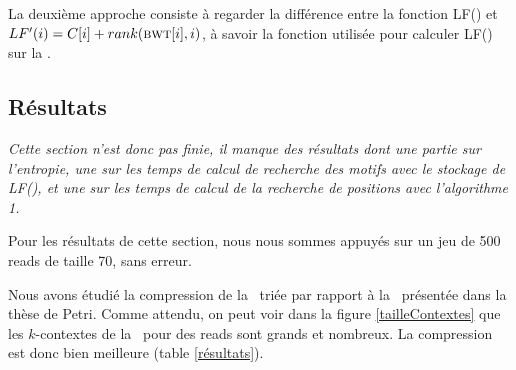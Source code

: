 La deuxième approche consiste à regarder la différence entre la fonction LF() et $LF'(i) = C[i] + rank(\textsc{bwt}[i], i)$, à savoir la fonction utilisée pour calculer LF() sur la \bwt.



%

%
%
%

\subsection{Résultats} 

\textit{Cette section n'est donc pas finie, il manque des résultats dont une partie sur l'entropie, une sur les temps de calcul de recherche des motifs avec le stockage de LF(), et une sur les temps de calcul de la recherche de positions avec l'algorithme 1.}

Pour les résultats de cette section, nous nous sommes appuyés sur un jeu de 500 reads de taille 70, sans erreur.

Nous avons étudié la compression de la \kbwt\ triée par rapport à la \kbwt\ présentée dans la thèse de Petri. Comme attendu, on peut voir dans la figure \ref{tailleContextes} que les $k$-contextes de la \kbwt\ pour des reads sont grands et nombreux. La compression est donc bien meilleure (table \ref{résultats}).

